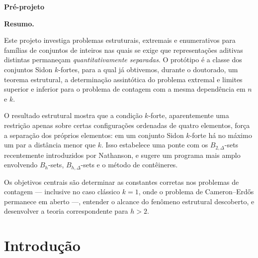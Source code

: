 \documentclass[11pt,a4paper]{article}
\theoremstyle{definition}
\theoremstyle{remark}
\begin{document}

\begin{center}

  {\LARGE\bfseries
    Pré-projeto
  }

\end{center}

\vspace{0.8cm}


\noindent\textbf{Resumo.}

Este projeto investiga problemas estruturais, extremais e enumerativos
para famílias de conjuntos de inteiros nas quais se exige que
representações aditivas distintas permaneçam \emph{quantitativamente
  separadas}. O protótipo é a classe dos conjuntos Sidon \(k\)-fortes,
para a qual já obtivemos, durante o doutorado, um teorema estrutural, a
determinação assintótica do problema extremal e limites superior e
inferior para o problema de contagem com a mesma dependência em \(n\) e
\(k\).

O resultado estrutural mostra que a condição \(k\)-forte, aparentemente
uma restrição apenas sobre certas configurações ordenadas de quatro
elementos, força a separação dos próprios elementos: em um conjunto
Sidon \(k\)-forte há no máximo um par a distância menor que \(k\). Isso
estabelece uma ponte com os \(B_{2,\Delta}\)-sets recentemente
introduzidos por Nathanson, e sugere um programa mais amplo envolvendo
\(B_h\)-sets, \(B_{h,\Delta}\)-sets e o método de contêineres.

Os objetivos centrais são determinar as constantes corretas nos
problemas de contagem --- inclusive no caso clássico \(k=1\), onde o
problema de Cameron--Erdős permanece em aberto ---, entender o alcance
do fenômeno estrutural descoberto, e desenvolver a teoria correspondente
para \(h>2\).

\vspace{0.4cm}
\tableofcontents
\newpage

\section{Introdução}
\end{document}
